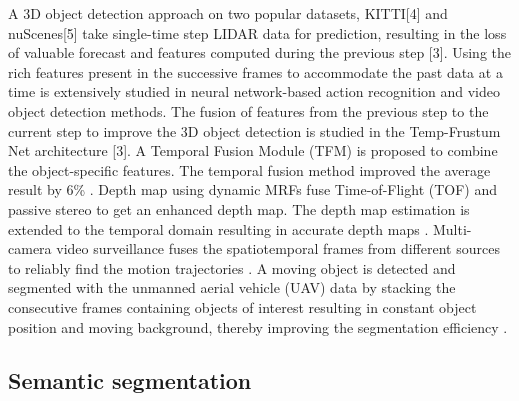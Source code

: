     A 3D object detection approach on two popular datasets, KITTI[4] and nuScenes[5] take single-time step LIDAR data for prediction, resulting in the loss of valuable forecast and features computed during the previous step [3]. Using the rich features present in the successive frames to accommodate the past data at a time is extensively studied in neural network-based action recognition \cite{10_han2016seq} \cite{11_kang2017t} \cite{12_ning2017spatially} \cite{13_lu2020retinatrack} and video object detection \cite{14_kopuklu2019you} \cite{15_feichtenhofer2016convolutional} \cite{16_wang2016temporal} methods. The fusion of features from the previous step to the current step to improve the 3D object detection is studied in the Temp-Frustum Net architecture [3]. A Temporal Fusion Module (TFM) is proposed to combine the object-specific features. The temporal fusion method improved the average result by 6\% \cite{17_erccelik2021temp}. Depth map using dynamic MRFs fuse Time-of-Flight (TOF) and passive stereo to get an enhanced depth map. The depth map estimation is extended to the temporal domain resulting in accurate depth maps \cite{18_zhu2009spatial}. Multi-camera video surveillance fuses the spatiotemporal frames from different sources to reliably find the motion trajectories \cite{19_wu2003multi}. A moving object is detected and segmented with the unmanned aerial vehicle (UAV) data by stacking the consecutive frames containing objects of interest resulting in constant object position and moving background, thereby improving the segmentation efficiency \cite{20_teutsch2012spatio}.

    \subsection{Semantic segmentation}
	
